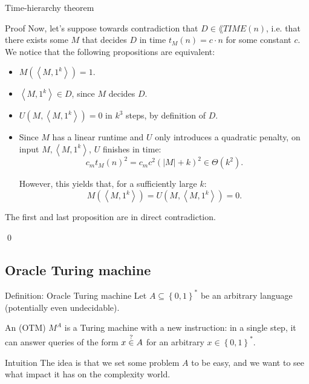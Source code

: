 \documentclass[a4paper]{article}
\begin{document}
\begin{parag}{Time-hierarchy theorem}
\begin{subparag}{Proof}
        Now, let's suppose towards contradiction that $D \in \lang{TIME}\left(n\right)$, i.e. that there exists some $M$ that decides $D$ in time $t_M\left(n\right) = c\cdot n$ for some constant $c$. We notice that the following propositions are equivalent:
        \begin{itemize}
            \item $M\left(\left\langle M, 1^k \right\rangle\right) = 1$.
            \item $\left\langle M, 1^k \right\rangle \in D$, since $M$ decides $D$.
            \item $U\left(M, \left\langle M, 1^k \right\rangle\right) = 0$ in $k^3$ steps, by definition of $D$.
            \item Since $M$ has a linear runtime and $U$ only introduces a quadratic penalty, on input $M, \left\langle M, 1^k \right\rangle$, $U$ finishes in time: 
            \[c_m t_M\left(n\right)^2 = c_m c^2 \left(\left|M\right| + k\right)^2 \in \Theta\left(k^2\right).\]
            
            However, this yields that, for a sufficiently large $k$: 
            \[M\left(\left\langle M, 1^k \right\rangle\right) = U\left(M, \left\langle M, 1^k \right\rangle\right) = 0.\]
        \end{itemize}

        The first and last proposition are in direct contradiction.

        \qed
    \end{subparag}
\end{parag}

\subsection{Oracle Turing machine}

\begin{parag}{Definition: Oracle Turing machine}
    Let $A \subseteq \left\{0, 1\right\}^*$ be an arbitrary language (potentially even undecidable). 

    An  (OTM) $M^A$ is a Turing machine with a new instruction: in a single step, it can answer queries of the form $x \over{\in}{?} A$ for an arbitrary $x \in \left\{0, 1\right\}^*$.

    \begin{subparag}{Intuition}
        The idea is that we set some problem $A$ to be easy, and we want to see what impact it has on the complexity world.
    \end{subparag}
\end{parag}
\end{document}
